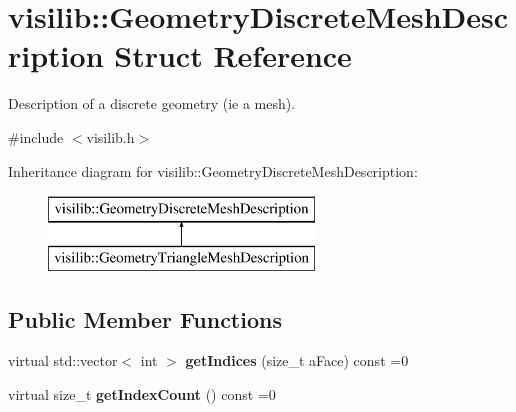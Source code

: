 \hypertarget{structvisilib_1_1_geometry_discrete_mesh_description}{}\section{visilib\+::Geometry\+Discrete\+Mesh\+Description Struct Reference}
\label{structvisilib_1_1_geometry_discrete_mesh_description}


Description of a discrete geometry (ie a mesh).  




{\ttfamily \#include $<$visilib.\+h$>$}

Inheritance diagram for visilib\+::Geometry\+Discrete\+Mesh\+Description\+:\begin{figure}[H]
\begin{center}
\leavevmode
\includegraphics[height=2.000000cm]{structvisilib_1_1_geometry_discrete_mesh_description}
\end{center}
\end{figure}
\subsection*{Public Member Functions}
\begin{DoxyCompactItemize}
\item 
\mbox{\label{structvisilib_1_1_geometry_discrete_mesh_description_a3c6788bb2758cbb7bb75827c0e9dd14f}} 
virtual std\+::vector$<$ int $>$ {\bfseries get\+Indices} (size\+\_\+t a\+Face) const =0
\item 
\mbox{\label{structvisilib_1_1_geometry_discrete_mesh_description_aa15955c8ac869f807470083b065beb7d}} 
virtual size\+\_\+t {\bfseries get\+Index\+Count} () const =0
\end{DoxyCompactItemize}
